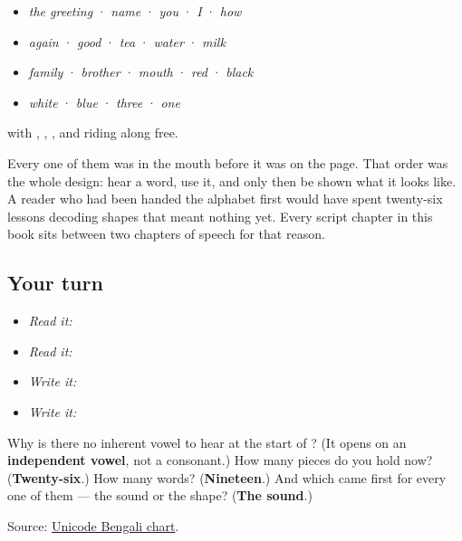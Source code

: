 \begin{itemize}
\raggedright
  \item \textbf{} \emph{the greeting} · \textbf{} \emph{name} · \textbf{} \emph{you} · \textbf{} \emph{I} · \textbf{} \emph{how}
  \item \textbf{} \emph{again} · \textbf{} \emph{good} · \textbf{} \emph{tea} · \textbf{} \emph{water} · \textbf{} \emph{milk}
  \item \textbf{} \emph{family} · \textbf{} \emph{brother} · \textbf{} \emph{mouth} · \textbf{} \emph{red} · \textbf{} \emph{black}
  \item \textbf{} \emph{white} · \textbf{} \emph{blue} · \textbf{} \emph{three} · \textbf{} \emph{one}
\end{itemize}

with \textbf{}, \textbf{}, \textbf{}, \textbf{} and \textbf{} riding along free.

Every one of them was in the mouth before it was on the page. That order was the whole design: hear a word, use it, and only then be shown what it looks like. A reader who had been handed the alphabet first would have spent twenty-six lessons decoding shapes that meant nothing yet. Every script chapter in this book sits between two chapters of speech for that reason.

\subsection*{Your turn}
\begin{itemize}
\raggedright
  \item \emph{Read it:}     
  \item \emph{Read it:}  
  \item \emph{Write it:} 
  \item \emph{Write it:}        
\end{itemize}

\begin{tcolorbox}[breakable,colback=teal!4,colframe=teal!35!black,title={Before you move on}]
Why is there no inherent vowel to hear at the start of \textbf{}? (It opens on an \textbf{independent vowel}, not a consonant.) How many pieces do you hold now? (\textbf{Twenty-six}.) How many words? (\textbf{Nineteen}.) And which came first for every one of them — the sound or the shape? (\textbf{The sound}.)

Source: \href{https://www.unicode.org/charts/PDF/U0980.pdf}{Unicode Bengali chart}.
\end{tcolorbox}
